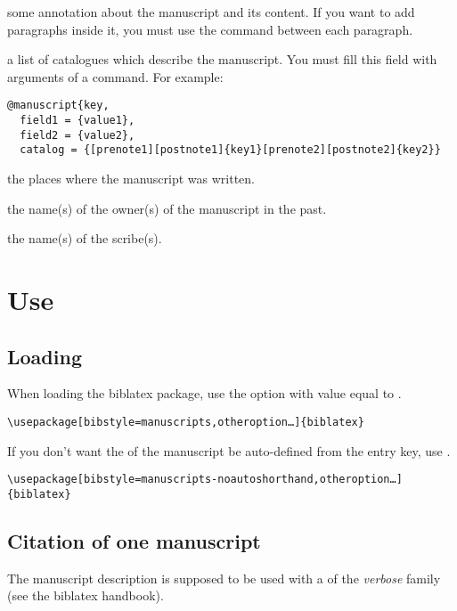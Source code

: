 \documentclass{ltxdockit}[2011/03/25]
\newcommand{\biblatex}{biblatex\xspace}
\begin{document}
\begin{fieldlist}
 some annotation about the manuscript and its content. If you want to add paragraphs inside it, you must use the  command between each paragraph.


 a list of catalogues which describe the manuscript. You must fill this field with arguments of a  command. For example:

\begin{verbatim}
@manuscript{key,
  field1 = {value1},
  field2 = {value2},
  catalog = {[prenote1][postnote1]{key1}[prenote2][postnote2]{key2}}
\end{verbatim}


 the places where the manuscript was written.

 the name(s) of the owner(s) of the manuscript in the past.

 the name(s) of the scribe(s).

\end{fieldlist}

\section{Use}
\subsection{Loading}

When loading the \biblatex package, use the option  with value equal to .

\begin{verbatim}
\usepackage[bibstyle=manuscripts,otheroption…]{biblatex}
\end{verbatim}

\label{noautoshorthand}If you don't want the  of the manuscript be auto-defined from the entry key, use .

\begin{verbatim}
\usepackage[bibstyle=manuscripts-noautoshorthand,otheroption…]{biblatex}
\end{verbatim}
\subsection{Citation of one manuscript}

The manuscript description is supposed to be used with a  of the \emph{verbose} family (see the \biblatex handbook).
\end{document}
